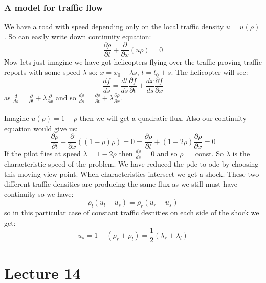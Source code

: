 \documentclass{article}
\begin{document}
      \subsubsection{A model for traffic flow}
      We have a road with speed depending only on the local traffic density $u = u(\rho)$. So can easily write down continuity equation:
      $$
       \frac{\partial \rho}{\partial t} + \frac{\partial}{\partial x} (u \rho) = 0
      $$
Now lets just imagine we have got helicopters flying over the traffic proving traffic reports with some speed $\lambda$ so:
$x = x_0 + \lambda s$, $t = t_0 + s$. The helicopter will see:
$$
 \frac{df}{ds} = \frac{dt}{ds} \frac{\partial f}{\partial t} + \frac{dx}{ds} \frac{\partial f}{\partial x}
$$
as $ \frac{d}{ds} = \frac{\partial}{\partial t} + \lambda \frac{\partial }{\partial x}$ and so $\frac{d \rho}{ds} = \frac{\partial \rho}{\partial t} +\lambda \frac{\partial \rho}{\partial x}$.\\\\
Imagine $u(\rho) = 1 -\rho$ then we will get a quadratic flux. Also our continuity equation would give us:
$$
\frac{\partial \rho}{\partial t} + \frac{\partial}{\partial x} ( (1- \rho) \rho) = 0 = \frac{\partial \rho}{\partial t} + ( 1- 2 \rho) \frac{\partial \rho}{\partial x} = 0
$$
If the pilot flies at speed $\lambda = 1- 2 \rho$ then $\frac{d \rho}{ds} =0$ and so $\rho =$ const. So $\lambda $ is the characteristic speed of the problem. We have reduced the pde to ode by choosing this moving view point. When characteristics intersect we get a shock. These two different traffic densities are producing the same flux as we still must have continuity so we have:
$$
 \rho_l ( u_l - u_s) = \rho_r( u_r - u_s)
$$
 so in this particular case of constant traffic desnities on each side of the shock we get:
 $$
 u_s = 1 - (\rho_r + \rho_l) = \frac{1}{2} (\lambda_r + \lambda_l)
 $$
 \section{Lecture 14}
\end{document}
